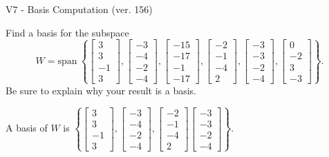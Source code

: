 \begin{exercise}
  \begin{exerciseTitle}V7 - Basis Computation (ver. 156)\end{exerciseTitle}
  \begin{exerciseStatement}
    Find a basis for the subspace 
\[W=\mathrm{span}\ \left\{\left[\begin{array}{r}
3 \\
3 \\
-1 \\
3
\end{array}\right] , \left[\begin{array}{r}
-3 \\
-4 \\
-2 \\
-4
\end{array}\right] , \left[\begin{array}{r}
-15 \\
-17 \\
-1 \\
-17
\end{array}\right] , \left[\begin{array}{r}
-2 \\
-1 \\
-4 \\
2
\end{array}\right] , \left[\begin{array}{r}
-3 \\
-3 \\
-2 \\
-4
\end{array}\right] , \left[\begin{array}{r}
0 \\
-2 \\
3 \\
-3
\end{array}\right]\right\}.\]
 Be sure to explain why your result is a basis.


  \end{exerciseStatement}
  \begin{exerciseAnswer}
   A basis of \(W\) is  \(\left\{\left[\begin{array}{r}
3 \\
3 \\
-1 \\
3
\end{array}\right] , \left[\begin{array}{r}
-3 \\
-4 \\
-2 \\
-4
\end{array}\right] , \left[\begin{array}{r}
-2 \\
-1 \\
-4 \\
2
\end{array}\right] \left[\begin{array}{r}
-3 \\
-3 \\
-2 \\
-4
\end{array}\right]\right\}\).
  


  \end{exerciseAnswer}
\end{exercise}